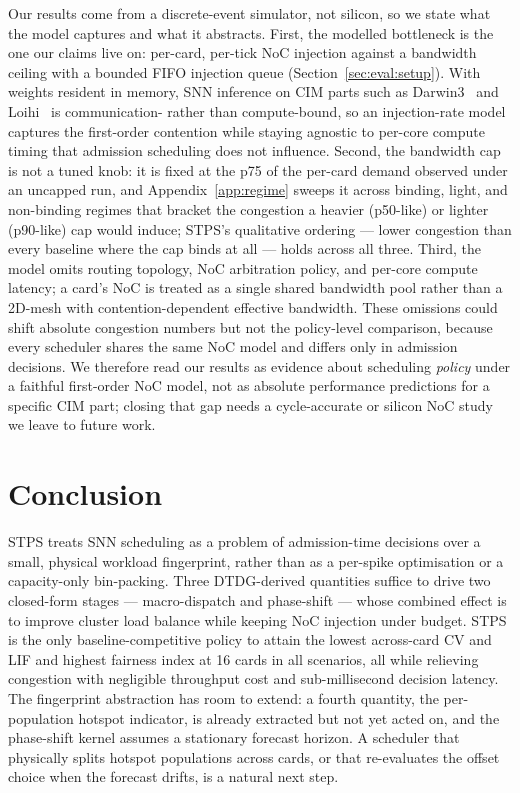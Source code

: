 \documentclass[letterpaper,twocolumn,10pt]{article}
\begin{document}
Our results come from a discrete-event simulator, not silicon, so we state what the model captures and what it abstracts. First, the modelled bottleneck is the one our claims live on: per-card, per-tick NoC injection against a bandwidth ceiling with a bounded FIFO injection queue (Section~\ref{sec:eval:setup}). With weights resident in memory, SNN inference on CIM parts such as Darwin3~\cite{ma2024darwin3} and Loihi~\cite{davies2018loihi} is communication- rather than compute-bound, so an injection-rate model captures the first-order contention while staying agnostic to per-core compute timing that admission scheduling does not influence. Second, the bandwidth cap is not a tuned knob: it is fixed at the p75 of the per-card demand observed under an uncapped run, and Appendix~\ref{app:regime} sweeps it across binding, light, and non-binding regimes that bracket the congestion a heavier (p50-like) or lighter (p90-like) cap would induce; STPS's qualitative ordering --- lower congestion than every baseline where the cap binds at all --- holds across all three. Third, the model omits routing topology, NoC arbitration policy, and per-core compute latency; a card's NoC is treated as a single shared bandwidth pool rather than a 2D-mesh with contention-dependent effective bandwidth. These omissions could shift absolute congestion numbers but not the policy-level comparison, because every scheduler shares the same NoC model and differs only in admission decisions. We therefore read our results as evidence about scheduling \emph{policy} under a faithful first-order NoC model, not as absolute performance predictions for a specific CIM part; closing that gap needs a cycle-accurate or silicon NoC study we leave to future work.

\section{Conclusion}
\label{sec:conclusion}

STPS treats SNN scheduling as a problem of admission-time decisions over a small, physical workload fingerprint, rather than as a per-spike optimisation or a capacity-only bin-packing. Three DTDG-derived quantities suffice to drive two closed-form stages --- macro-dispatch and phase-shift --- whose combined effect is to improve cluster load balance while keeping NoC injection under budget. STPS is the only baseline-competitive policy to attain the lowest across-card CV and LIF and highest fairness index at 16 cards in all scenarios, all while relieving congestion with negligible throughput cost and sub-millisecond decision latency. The fingerprint abstraction has room to extend: a fourth quantity, the per-population hotspot indicator, is already extracted but not yet acted on, and the phase-shift kernel assumes a stationary forecast horizon. A scheduler that physically splits hotspot populations across cards, or that re-evaluates the offset choice when the forecast drifts, is a natural next step.
\end{document}
